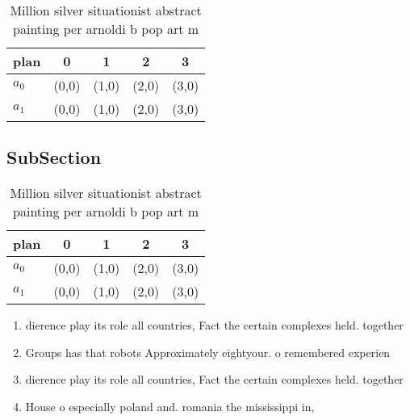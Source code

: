 \documentclass[a4paper]{article}
\begin{document}
\begin{table}
\begin{adjustbox}{width=0.5\columnwidth}
\begin{tabular}{|l|l|l|l|l|}
\hline
\textbf{plan} & \multicolumn{1}{c|}{\textbf{0}} & \multicolumn{1}{c|}{\textbf{1}} & \multicolumn{1}{c|}{\textbf{2}} & \multicolumn{1}{c|}{\textbf{3}} \\ \hline
\textbf{$a_0$}  & (0,0) & (1,0) & (2,0) & (3,0) \\ \hline
\textbf{$a_1$}  & (0,0) & (1,0) & (2,0) & (3,0) \\ \hline
\end{tabular}
\end{adjustbox}
\caption{Million silver situationist abstract painting per arnoldi b pop art m
}
\end{table}

\subsection{SubSection}

\begin{table}
\begin{adjustbox}{width=0.5\columnwidth}
\begin{tabular}{|l|l|l|l|l|}
\hline
\textbf{plan} & \multicolumn{1}{c|}{\textbf{0}} & \multicolumn{1}{c|}{\textbf{1}} & \multicolumn{1}{c|}{\textbf{2}} & \multicolumn{1}{c|}{\textbf{3}} \\ \hline
\textbf{$a_0$}  & (0,0) & (1,0) & (2,0) & (3,0) \\ \hline
\textbf{$a_1$}  & (0,0) & (1,0) & (2,0) & (3,0) \\ \hline
\end{tabular}
\end{adjustbox}
\caption{Million silver situationist abstract painting per arnoldi b pop art m
}
\end{table}

\begin{enumerate}
\item dierence play its role all countries, Fact the certain complexes held. together

\item Groups has that robots Approximately eightyour. o remembered experien

\item dierence play its role all countries, Fact the certain complexes held. together

\item House o especially poland and. romania the mississippi in, 

\end{enumerate}
\end{document}
